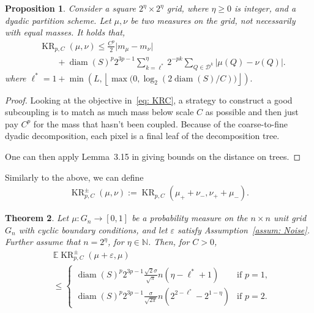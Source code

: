\documentclass{article}
\theoremstyle{plain}
\newtheorem{thm}{Theorem}[section]
\newtheorem{prop}[thm]{Proposition}
\theoremstyle{definition}
\theoremstyle{remark}
\DeclareMathOperator{\diam}{diam}
\begin{document}
\begin{prop}
\label{prop: KR}
Consider a square $2^\eta\times 2^\eta$ grid, where $\eta \ge 0$ is integer, and a dyadic partition scheme. Let $\mu, \nu$ be two measures on the grid, not necessarily with equal masses. 
It holds that,
\begin{align}
&\operatorname{KR}_{p,C}(\mu, \nu)  \le
        \frac{C^p}{2}
            \lvert m_\mu - m_\nu\rvert
            \\&\qquad+
           \diam(S)^p  2^{3p-1}
            \sum_{k=\ell^*}^{\eta}
            2^{-pk}
            \sum _{Q\in \mathcal{D}^k}
            \lvert
                \mu(Q)-\nu(Q)
            \rvert.    \nonumber
\end{align}
where
\(
\ell^*=1+ \min\left( L, \left\lfloor \max\big(0 , \log_2 \left( 2\diam(S)/C  \right)\big) \right\rfloor \right).
\)
\end{prop}
\begin{proof}
Looking at the objective in~\eqref{eq: KRC}, a strategy to construct a good subcoupling is to match as much mass below scale $C$ as possible and then just pay $C^p$ for the mass that hasn't been coupled. 
Because of the coarse-to-fine dyadic decomposition, each pixel is a final leaf of the decomposition tree. 

One can then apply Lemma~3.15 in \citet{StrulevaHundrieserSchuhmacherMunk2026} giving bounds on the distance on trees. 
\end{proof}

Similarly to the above, we can define 
\begin{align}
\operatorname{KR}_{p,C}^\pm(\mu, \nu) := \operatorname{KR}_{p,C}(\mu_++\nu_-, \nu_++\mu_-) .
\end{align}
\begin{thm}
\label{thm: KR between a measure and its noisy counterpart}
Let $\mu : G_n \to [0,1]$ be a probability measure on the $n\times n$ unit grid $G_n$ with cyclic boundary conditions, and let $\varepsilon$ satisfy Assumption~\ref{assum: Noise}. Further assume that $n = 2 ^\eta$, for $\eta \in \mathbb{N}$. Then, for $C>0$,
\begin{align}
\label{eq: KR_cases}
    &\mathbb{E} \operatorname{KR}_{p,C}^\pm(\mu+\varepsilon,\mu) \\
    &\le \begin{cases} 
          \diam(S)^p 2^{3p-1} \frac{\sqrt{2}\sigma}{\sqrt{\pi}} n (\eta-\ell^*+1) & \text{if } p=1, \\[1ex]
        \diam(S)^p 2^{3p-1} \frac{\sigma}{\sqrt{2\pi}}  n (2^{2-\ell^*} - 2^{1-\eta}) & \text{if } p=2.
    \end{cases} \nonumber
\end{align}
\end{thm}
\end{document}
